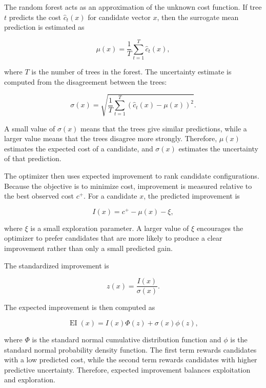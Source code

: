\documentclass[12pt,a4paper,oneside]{report}
\begin{document}
\noindent The random forest acts as an approximation of the unknown cost function. If
tree \(t\) predicts the cost \(\hat{c}_t(x)\) for candidate vector \(x\), then
the surrogate mean prediction is estimated as

\[
\mu(x) =
\frac{1}{T}
\sum_{t=1}^{T}
\hat{c}_t(x),
\]

\noindent where \(T\) is the number of trees in the forest. The uncertainty estimate is
computed from the disagreement between the trees:

\[
\sigma(x) =
\sqrt{
\frac{1}{T}
\sum_{t=1}^{T}
\left(
\hat{c}_t(x) - \mu(x)
\right)^2
}.
\]

\noindent A small value of \(\sigma(x)\) means that the trees give similar predictions,
while a larger value means that the trees disagree more strongly. Therefore,
\(\mu(x)\) estimates the expected cost of a candidate, and \(\sigma(x)\)
estimates the uncertainty of that prediction.

\noindent The optimizer then uses expected improvement to rank candidate configurations.
Because the objective is to minimize cost, improvement is measured relative to
the best observed cost \(c^+\). For a candidate \(x\), the predicted improvement
is

\[
I(x) = c^+ - \mu(x) - \xi,
\]

\noindent where \(\xi\) is a small exploration parameter. A larger value of \(\xi\)
encourages the optimizer to prefer candidates that are more likely to produce a
clear improvement rather than only a small predicted gain.

\noindent The standardized improvement is

\[
z(x) =
\frac{I(x)}{\sigma(x)}.
\]

\noindent The expected improvement is then computed as

\[
\operatorname{EI}(x) =
I(x)\Phi(z)
+
\sigma(x)\phi(z),
\]

\noindent where \(\Phi\) is the standard normal cumulative distribution function and
\(\phi\) is the standard normal probability density function. The first term
rewards candidates with a low predicted cost, while the second term rewards
candidates with higher predictive uncertainty. Therefore, expected improvement
balances exploitation and exploration.
\end{document}
